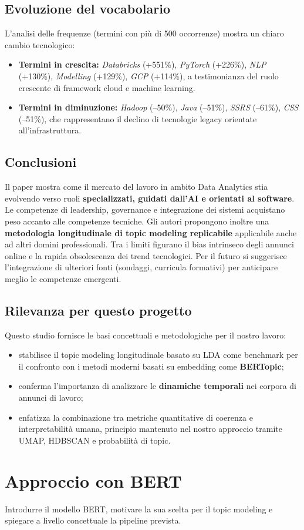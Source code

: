 \subsection{Evoluzione del vocabolario}
L'analisi delle frequenze (termini con più di 500 occorrenze) mostra un chiaro cambio tecnologico:
\begin{itemize}
    \item \textbf{Termini in crescita:} \textit{Databricks} (+551\%), \textit{PyTorch} (+226\%), \textit{NLP} (+130\%), \textit{Modelling} (+129\%), \textit{GCP} (+114\%), a testimonianza del ruolo crescente di framework cloud e machine learning.
    \item \textbf{Termini in diminuzione:} \textit{Hadoop} (--50\%), \textit{Java} (--51\%), \textit{SSRS} (--61\%), \textit{CSS} (--51\%), che rappresentano il declino di tecnologie legacy orientate all'infrastruttura.
\end{itemize}

\subsection{Conclusioni}
Il paper mostra come il mercato del lavoro in ambito Data Analytics stia evolvendo verso ruoli \textbf{specializzati, guidati dall'AI e orientati al software}.
Le competenze di leadership, governance e integrazione dei sistemi acquistano peso accanto alle competenze tecniche.
Gli autori propongono inoltre una \textbf{metodologia longitudinale di topic modeling replicabile} applicabile anche ad altri domini professionali.
Tra i limiti figurano il bias intrinseco degli annunci online e la rapida obsolescenza dei trend tecnologici.
Per il futuro si suggerisce l'integrazione di ulteriori fonti (sondaggi, curricula formativi) per anticipare meglio le competenze emergenti.

\subsection{Rilevanza per questo progetto}
Questo studio fornisce le basi concettuali e metodologiche per il nostro lavoro:
\begin{itemize}
    \item stabilisce il topic modeling longitudinale basato su LDA come benchmark per il confronto con i metodi moderni basati su embedding come \textbf{BERTopic};
    \item conferma l'importanza di analizzare le \textbf{dinamiche temporali} nei corpora di annunci di lavoro;
    \item enfatizza la combinazione tra metriche quantitative di coerenza e interpretabilità umana, principio mantenuto nel nostro approccio tramite UMAP, HDBSCAN e probabilità di topic.
\end{itemize}

\section{Approccio con BERT}
Introdurre il modello BERT, motivare la sua scelta per il topic modeling e spiegare a livello concettuale la pipeline prevista.
